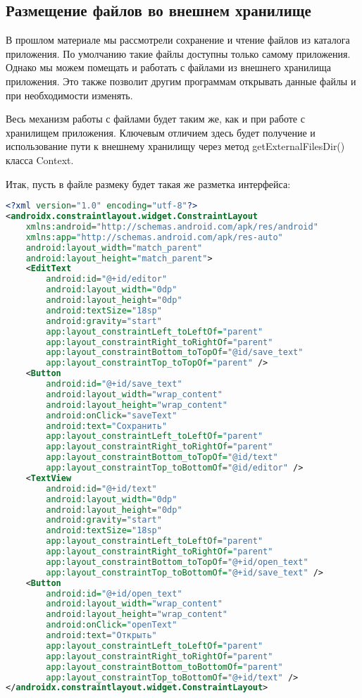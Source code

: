 \subsection{Размещение файлов во внешнем хранилище}
В прошлом материале мы рассмотрели сохранение и чтение файлов из
каталога приложения. По умолчанию такие файлы доступны только самому
приложения. Однако мы можем помещать и работать с файлами из внешнего
хранилища приложения. Это также позволит другим программам открывать
данные файлы и при необходимости изменять.\par
Весь механизм работы с файлами будет таким же, как и при работе с
хранилищем приложения. Ключевым отличием здесь будет получение и
использование пути к внешнему хранилищу через метод
getExternalFilesDir() класса Context.\par
Итак, пусть в файле размеку будет такая же разметка интерфейса:

\begin{lstlisting}[language=XML
	, label=lst:
	]
<?xml version="1.0" encoding="utf-8"?>
<androidx.constraintlayout.widget.ConstraintLayout
    xmlns:android="http://schemas.android.com/apk/res/android"
    xmlns:app="http://schemas.android.com/apk/res-auto"
    android:layout_width="match_parent"
    android:layout_height="match_parent">
    <EditText
        android:id="@+id/editor"
        android:layout_width="0dp"
        android:layout_height="0dp"
        android:textSize="18sp"
        android:gravity="start"
        app:layout_constraintLeft_toLeftOf="parent"
        app:layout_constraintRight_toRightOf="parent"
        app:layout_constraintBottom_toTopOf="@id/save_text"
        app:layout_constraintTop_toTopOf="parent" />
    <Button
        android:id="@+id/save_text"
        android:layout_width="wrap_content"
        android:layout_height="wrap_content"
        android:onClick="saveText"
        android:text="Сохранить"
        app:layout_constraintLeft_toLeftOf="parent"
        app:layout_constraintRight_toRightOf="parent"
        app:layout_constraintBottom_toTopOf="@id/text"
        app:layout_constraintTop_toBottomOf="@id/editor" />
    <TextView
        android:id="@+id/text"
        android:layout_width="0dp"
        android:layout_height="0dp"
        android:gravity="start"
        android:textSize="18sp"
        app:layout_constraintLeft_toLeftOf="parent"
        app:layout_constraintRight_toRightOf="parent"
        app:layout_constraintBottom_toTopOf="@+id/open_text"
        app:layout_constraintTop_toBottomOf="@+id/save_text" />
    <Button
        android:id="@+id/open_text"
        android:layout_width="wrap_content"
        android:layout_height="wrap_content"
        android:onClick="openText"
        android:text="Открыть"
        app:layout_constraintLeft_toLeftOf="parent"
        app:layout_constraintRight_toRightOf="parent"
        app:layout_constraintBottom_toBottomOf="parent"
        app:layout_constraintTop_toBottomOf="@+id/text" />
</androidx.constraintlayout.widget.ConstraintLayout>
\end{lstlisting}

